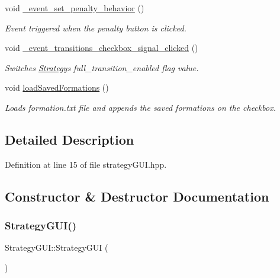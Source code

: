 \begin{DoxyCompactItemize}
void \hyperlink{class_strategy_g_u_i_ab0aaf8ef6a664c6391c6fa0d6de40861}{\+\_\+event\+\_\+set\+\_\+penalty\+\_\+behavior} ()
\begin{DoxyCompactList}\small\item\em Event triggered when the \textquotesingle{}penalty\textquotesingle{} button is clicked. \end{DoxyCompactList}\item 
void \hyperlink{class_strategy_g_u_i_a9ca1e9548a5cf277de63fe92ad92002b}{\+\_\+event\+\_\+transitions\+\_\+checkbox\+\_\+signal\+\_\+clicked} ()
\begin{DoxyCompactList}\small\item\em Switches \hyperlink{class_strategy}{Strategy}\textquotesingle{}s full\+\_\+transition\+\_\+enabled flag value. \end{DoxyCompactList}\item 
void \hyperlink{class_strategy_g_u_i_a616a0f321878532cf85cfd02564758b5}{load\+Saved\+Formations} ()
\begin{DoxyCompactList}\small\item\em Loads formation.\+txt file and appends the saved formations on the checkbox. \end{DoxyCompactList}\end{DoxyCompactItemize}


\subsection{Detailed Description}


Definition at line 15 of file strategy\+G\+U\+I.\+hpp.



\subsection{Constructor \& Destructor Documentation}
\mbox{\label{class_strategy_g_u_i_a6676ae87f9ccabe157ec8e60f94041b7}} 
\subsubsection{\texorpdfstring{Strategy\+G\+U\+I()}{StrategyGUI()}}
{\footnotesize\ttfamily Strategy\+G\+U\+I\+::\+Strategy\+G\+UI (\begin{DoxyParamCaption}{ }\end{DoxyParamCaption})}



